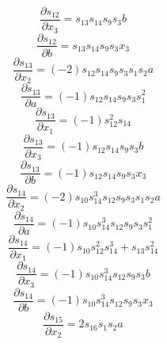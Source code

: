 \documentclass[10pt,a4paper]{article}
\begin{document}
\begin{dmath*}\frac{\partial s_{12}}{\partial x_{3}} = s_{13}  s_{14}  s_{9}  s_{3}  b\end{dmath*}
\begin{dmath*}\frac{\partial s_{12}}{\partial b} = s_{13}  s_{14}  s_{9}  s_{3}  x_{3}\end{dmath*}
\begin{dmath*}\frac{\partial s_{13}}{\partial x_{2}} = \left(-2\right)  s_{12}  s_{14}  s_{9}  s_{3}  s_{1}  s_{2}  a\end{dmath*}
\begin{dmath*}\frac{\partial s_{13}}{\partial a} = \left(-1\right)  s_{12}  s_{14}  s_{9}  s_{3}  s_{1} ^ {2}\end{dmath*}
\begin{dmath*}\frac{\partial s_{13}}{\partial x_{1}} = \left(-1\right)  s_{12} ^ {2}  s_{14}\end{dmath*}
\begin{dmath*}\frac{\partial s_{13}}{\partial x_{3}} = \left(-1\right)  s_{12}  s_{14}  s_{9}  s_{3}  b\end{dmath*}
\begin{dmath*}\frac{\partial s_{13}}{\partial b} = \left(-1\right)  s_{12}  s_{14}  s_{9}  s_{3}  x_{3}\end{dmath*}
\begin{dmath*}\frac{\partial s_{14}}{\partial x_{2}} = \left(-2\right)  s_{10}  s_{14} ^ {3}  s_{12}  s_{9}  s_{3}  s_{1}  s_{2}  a\end{dmath*}
\begin{dmath*}\frac{\partial s_{14}}{\partial a} = \left(-1\right)  s_{10}  s_{14} ^ {3}  s_{12}  s_{9}  s_{3}  s_{1} ^ {2}\end{dmath*}
\begin{dmath*}\frac{\partial s_{14}}{\partial x_{1}} = \left(-1\right)  s_{10}  s_{12} ^ {2}  s_{14} ^ {3} + s_{13}  s_{14} ^ {2}\end{dmath*}
\begin{dmath*}\frac{\partial s_{14}}{\partial x_{3}} = \left(-1\right)  s_{10}  s_{14} ^ {3}  s_{12}  s_{9}  s_{3}  b\end{dmath*}
\begin{dmath*}\frac{\partial s_{14}}{\partial b} = \left(-1\right)  s_{10}  s_{14} ^ {3}  s_{12}  s_{9}  s_{3}  x_{3}\end{dmath*}
\begin{dmath*}\frac{\partial s_{15}}{\partial x_{2}} = 2  s_{16}  s_{1}  s_{2}  a\end{dmath*}
\end{document}
